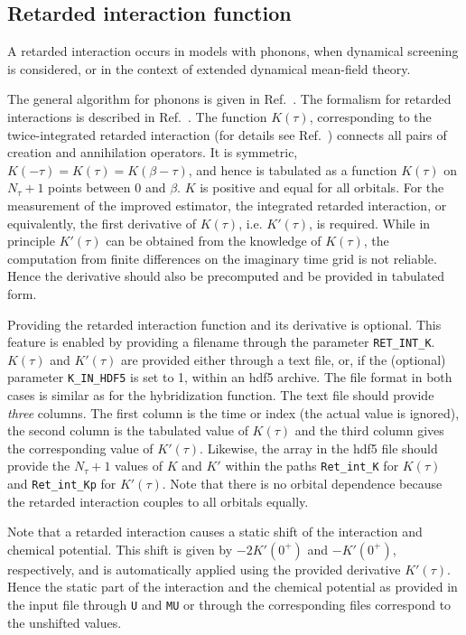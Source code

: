 \documentclass[aps,prb,floatfix,superscriptaddress,twocolumn,notitlepage]{revtex4-1}
\begin{document}
\subsection{Retarded interaction function}
\label{k_ret_int}
A retarded interaction occurs in models with phonons, when dynamical screening is considered, or in the context of extended dynamical mean-field theory.

The general algorithm for phonons is given in Ref.~. The formalism for retarded interactions is described in Ref.~. The function $K(\tau)$, corresponding to the twice-integrated retarded interaction (for details see Ref.~) connects all pairs of creation and annihilation operators. It is symmetric, $K(-\tau)=K(\tau)=K(\beta-\tau)$, and hence is tabulated as a function $K(\tau)$ on $N_{\tau}+1$ points between $0$ and $\beta$. $K$ is positive and equal for all orbitals.
For the measurement of the improved estimator, the integrated retarded interaction, or equivalently, the first derivative of $K(\tau)$, i.e. $K'(\tau)$, is required. While in principle $K'(\tau)$ can be obtained from the knowledge of $K(\tau)$, the computation from finite differences on the imaginary time grid is not reliable. Hence the derivative should also be precomputed and be provided in tabulated form.

Providing the retarded interaction function and its derivative is optional. This feature is enabled by providing a filename through the parameter \verb#RET_INT_K#.
$K(\tau)$ and $K'(\tau)$ are provided either through a text file, or, if the (optional) parameter \verb#K_IN_HDF5# is set to 1, within an hdf5 archive.
The file format in both cases is similar as for the hybridization function. The text file should provide \emph{three} columns. The first column is the time or index (the actual value is ignored), the second column is the tabulated value of $K(\tau)$ and the third column gives the corresponding value of $K'(\tau)$.
Likewise, the array in the hdf5 file should provide the $N_{\tau}+1$ values of $K$ and $K'$ within the paths \verb#Ret_int_K# for $K(\tau)$ and \verb#Ret_int_Kp# for $K'(\tau)$.
Note that there is no orbital dependence because the retarded interaction couples to all orbitals equally.

Note that a retarded interaction causes a static shift of the interaction and chemical potential. This shift is given by $-2K'(0^{+})$ and $-K'(0^{+})$, respectively, and is automatically applied using the provided derivative $K'(\tau)$. Hence the static part of the interaction and the chemical potential as provided in the input file through \verb#U# and \verb#MU# or through the corresponding files correspond to the unshifted values.
\end{document}
